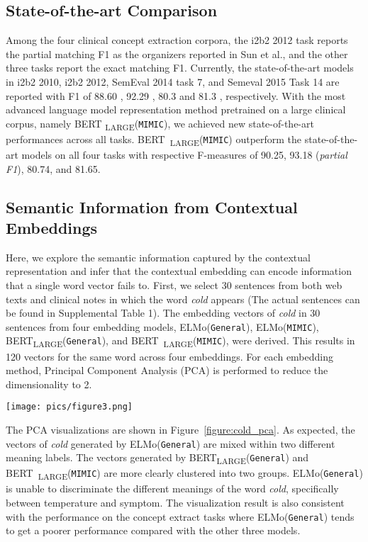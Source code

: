 \documentclass[11pt,a4paper]{article}
\begin{document}
\subsection{State-of-the-art Comparison}
Among the four clinical concept extraction corpora, the i2b2 2012 task reports the partial matching F1 as the organizers reported in Sun et al.,  and the other three tasks report the exact matching F1. Currently, the state-of-the-art models in i2b2 2010, i2b2 2012, SemEval 2014 task 7, and Semeval 2015 Task 14 are reported with F1 of 88.60 \cite{zhu2018clinical}, 92.29 \cite{liu2017entity}, 80.3 \cite{tang2015recognizing} and 81.3 \cite{zhang2014uth_ccb}, respectively. With the most advanced language model representation method pretrained on a large clinical corpus, namely BERT \textsubscript{LARGE}(\verb|MIMIC|), we achieved new state-of-the-art performances across all tasks. \hbox{BERT \textsubscript{LARGE}(\verb|MIMIC|)} outperform the state-of-the-art models on all four tasks with respective F-measures of 90.25, 93.18 (\textit{partial F1}), 80.74, and 81.65. 
\subsection{Semantic Information from Contextual Embeddings}
Here, we explore the semantic information captured by the contextual representation and infer that the contextual embedding can encode information that a single word vector fails to. First, we select 30 sentences from both web texts and clinical notes in which the word \textit{cold} appears (The actual sentences can be found in Supplemental Table 1). The embedding vectors of \textit{cold} in 30 sentences from four embedding models, ELMo(\verb|General|), ELMo(\verb|MIMIC|), \hbox{BERT\textsubscript{LARGE}(\verb|General|)}, and \hbox{BERT \textsubscript{LARGE}(\verb|MIMIC|)}, were derived. This results in 120 vectors for the same word across four embeddings. For each embedding method, Principal Component Analysis (PCA) is performed to reduce the dimensionality to 2.

\begin{figure*}[t!]
\centering
\texttt{[image: pics/figure3.png]}
\caption{Principal Component Analysis (PCA) visualizations using embedding vectors of cold from embedding models (purple: \textit{cold} as temperature meaning; red: \textit{cold} as symptom).}
\label{figure:cold_pca}
\end{figure*}

The PCA visualizations are shown in Figure~\ref{figure:cold_pca}. As expected, the vectors of \textit{cold} generated by \hbox{ELMo(\texttt{General})} are mixed within two different meaning labels. The vectors generated by \hbox{BERT\textsubscript{LARGE}(\verb|General|)} and \hbox{BERT \textsubscript{LARGE}(\verb|MIMIC|)} are more clearly clustered into two groups. \hbox{ELMo(\texttt{General})} is unable to discriminate the different meanings of the word \textit{cold}, specifically between temperature and symptom. The visualization result is also consistent with the performance on the concept extract tasks where \hbox{ELMo(\texttt{General})} tends to get a poorer performance compared with the other three models.
\end{document}
